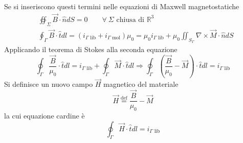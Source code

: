 Se si inseriscono questi termini nelle equazioni di Maxwell magnetostatiche
\begin{align*}
&\oiint_\Sigma \vec{B}\cdot\hat{n}dS = 0 \qquad \forall\ \Sigma\text{ chiusa di }\mathbb{R}^3\\
&\oint_\Gamma \vec{B}\cdot\hat{t} dl = (i_{\Gamma\text{ lib}} + i_{\Gamma\text{ mol}})\mu_0
= \mu_0 i_{\Gamma\text{ lib}} + \mu_0 \iint_{S_\Gamma} \nabla\times\vec{M}\cdot\hat{n}dS
\end{align*}
Applicando il teorema di Stokes alla seconda equazione
$$
\oint_\Gamma \frac{\vec{B}}{\mu_0} \cdot\hat{t}dl = i_{\Gamma\text{ lib}} + \oint_\Gamma \vec{M}\cdot\hat{t}dl \Rightarrow \oint_\Gamma \left(\frac{\vec{B}}{\mu_0} - \vec{M}\right)\cdot\hat{t} dl = i_{\Gamma \text{ lib}}
$$
Si definisce un nuovo campo $\vec{H}$ magnetico del materiale
$$
\vec{H} \stackrel{\text{def}}{=} \frac{\vec{B}}{\mu_0} - \vec{M}
$$
la cui equazione cardine è
$$
\oint_\Gamma \vec{H}\cdot\hat{t} dl = i_{\Gamma\text{ lib}}
$$
